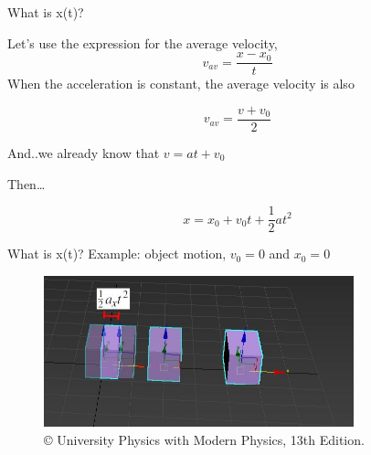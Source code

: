\documentclass[]{beamer}
\begin{document}

\begin{frame}
   What is x(t)?
   \vspace{3mm}

   Let's use the expression for the average velocity,
\begin{equation*}
   v_{av}=\frac{x-x_0}{t}
\end{equation*}
When the acceleration is constant,  the average velocity is also

\begin{equation*}
   v_{av}=\frac{v+v_0}{2}
\end{equation*}

And..we already know that $v=at+v_0 $

Then\dots

\begin{equation}
   x=x_0+v_0t+\frac{1}{2}at^2
\end{equation}
 \end{frame}


 

\begin{frame}
   What is x(t)?
   \vspace{3mm}
Example: object motion, $v_0=0$ and $x_0=0$
   \begin{figure}[h!]
 
      \includegraphics[width=0.8\textwidth]{images/16.jpg}
      \caption{ {\tiny © University Physics 
      with Modern Physics, 13th Edition.} }
    \end{figure}


 \end{frame}






\end{document}
